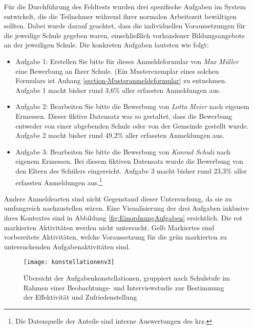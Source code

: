 Für die Durchführung des Feldtests wurden drei spezifische Aufgaben im System entwickelt, die die Teilnehmer während ihrer normalen Arbeitszeit bewältigen sollten. Dabei wurde darauf geachtet, dass die individuellen  Voraussetzungen für die jeweilige Schule gegeben waren, einschließlich  vorhandener Bildungsangebote an der jeweiligen Schule. Die konkreten Aufgaben lauteten wie folgt:

\begin{itemize}
\item Aufgabe 1: \glqq Erstellen Sie bitte für dieses Anmeldeformular von \textit{Max Müller} eine Bewerbung an Ihrer Schule.\grqq{} (Ein Musterexemplar eines solchen Formulars ist Anhang \ref{section-Musteranmeldeformular} zu entnehmen. Aufgabe 1 macht bisher rund 3,6\% aller erfassten Anmeldungen aus.
\item Aufgabe 2: \glqq Bearbeiten Sie bitte die Bewerbung von \textit{Lotta Meier} nach eigenem Ermessen.\grqq{}  Dieser fiktive Datensatz war so gestaltet, dass die Bewerbung entweder von einer abgebenden Schule oder von der Gemeinde gestellt wurde. Aufgabe 2 macht bisher rund 49,2\% aller erfassten Anmeldungen aus.
\item Aufgabe 3: \glqq Bearbeiten Sie bitte die Bewerbung von \textit{Konrad Schulz} nach eigenem Ermessen.\grqq{}  Bei diesem fiktiven Datensatz wurde die Bewerbung von den Eltern des Schülers eingereicht. Aufgabe 3 macht bisher rund 23,3\% aller erfassten Anmeldungen aus.\footnote{Die Datenquelle der Anteile sind interne Auswertungen des krz.}
\end{itemize}

Andere Anmeldearten sind nicht Gegenstand dieser Untersuchung, da sie zu umfangreich nachzustellen wären. Eine Visualisierung der drei Aufgaben inklusive ihres Kontextes sind in Abbildung \ref{fig:EinordnungAufgaben} ersichtlich. Die rot markierten Aktivitäten werden nicht untersucht. Gelb Markiertes sind vorbereitete Aktivitäten, welche Voraussetzung für die grün markierten zu untersuchenden Aufgabenaktivitäten sind. 

\begin{figure}[H]
    \caption{Übersicht der Aufgabenkonstellationen, gruppiert nach Schulstufe im Rahmen einer Beobachtungs- und Interviewstudie zur Bestimmung der Effektivität und Zufriedenstellung}
    \texttt{[image: konstellationenv3]}
    \label{fig:konstellationenv3}
\end{figure}


